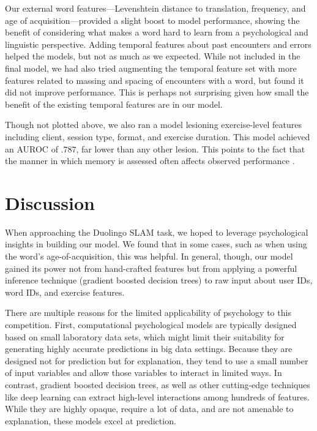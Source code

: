 \documentclass[11pt,a4paper]{article}
\begin{document}
Our external word features---Levenshtein distance to translation, frequency, and
age of acquisition---provided a slight boost to model performance, showing the
benefit of considering what makes a word hard to learn from a psychological and
linguistic perspective. Adding temporal features about past encounters and
errors helped the models, but not as much as we expected. While not included in
the final model, we had also tried augmenting the temporal feature set with more
features related to massing and spacing of encounters with a word, but found it
did not improve performance. This is perhaps not surprising given how small the
benefit of the existing temporal features are in our model.

Though not plotted above, we also ran a model lesioning exercise-level features
including client, session type, format, and exercise duration. This model
achieved an AUROC of $.787$, far lower than any other lesion. This points to the
fact that the manner in which memory is assessed often affects observed performance 
\cite[e.g., the large literature in psychology on the difference between recall and recognition memory,][]{yonelinas2002nature}. 

\section{Discussion}

When approaching the Duolingo SLAM task, we hoped to leverage psychological
insights in building our model. We found that in some cases, such as when using the
word's age-of-acquisition, this was helpful. In general, though, our model gained its
power not from hand-crafted features but from applying a powerful inference
technique (gradient boosted decision trees) to raw input about user IDs, word IDs, and
exercise features.

There are multiple reasons for the limited applicability of psychology to this
competition. First, computational psychological models are typically designed based 
on small laboratory data sets, which might limit their suitability for generating highly
accurate predictions in big data settings.
Because they are designed not for prediction but for explanation, they tend to
use a small number of input variables and allow those variables to interact
in limited ways. In contrast, gradient boosted decision trees, as well as other
cutting-edge techniques like deep learning can extract high-level
interactions among hundreds of features. While they are highly opaque, require
a lot of data, and are not amenable to explanation, these models excel at prediction.
\end{document}

